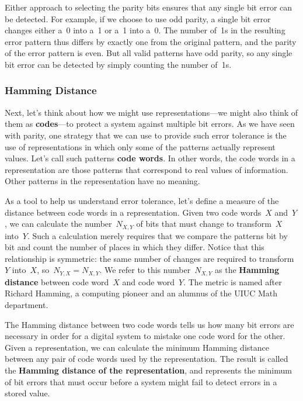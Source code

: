 Either approach to selecting the parity bits ensures that any single
bit error can be detected.  For example, if we choose to use odd
parity, a single
bit error changes either a~0 into a~1 or a~1 into a~0.
The number of~1s in the resulting error pattern thus
differs by exactly one from the original pattern, and the parity of
the error pattern is even.  But all valid patterns have odd parity,
so any single bit error can be detected by simply counting the number
of~1s.


\subsubsection{Hamming Distance}

Next, let's think about how we might use representations---we might
also think of them as {\bf codes}---to protect a system against 
multiple bit errors.  As we have seen with parity, one strategy that
we can use to provide such error tolerance is the use of representations
in which only some of the patterns actually represent values.
Let's call such patterns {\bf code words}.  In other words, the
code words in a representation are those patterns that correspond to 
real values of information.  Other patterns in the representation have no 
meaning.

As a tool to help us understand error tolerance, let's define
a measure of the distance between code words in a representation.
Given two code words~$X$ and~$Y$, we can calculate the number~$N_{X,Y}$ of 
bits that must change to transform~$X$ into~$Y$.  Such a calculation
merely requires that we compare the patterns bit by bit and count
the number of places in which they differ.  Notice that this
relationship is symmetric: the same number of changes are required
to transform~$Y$ into~$X$, so~$N_{Y,X}=N_{X,Y}$.  
%
We refer to this number~$N_{X,Y}$ as the {\bf Hamming distance} between
code word~$X$ and code word~$Y$.  
%
The metric is named after Richard Hamming, a computing pioneer and an 
alumnus of the UIUC Math department.

The Hamming distance between two code words tells us how many bit errors
are necessary in order for a digital system to mistake one code word
for the other.  Given a representation, we can calculate the minimum
Hamming distance between any pair of code words used by the 
representation.  The result is called the {\bf Hamming distance of the 
representation}, and represents the minimum of bit errors that must
occur before a system might fail to detect errors in a stored value.

